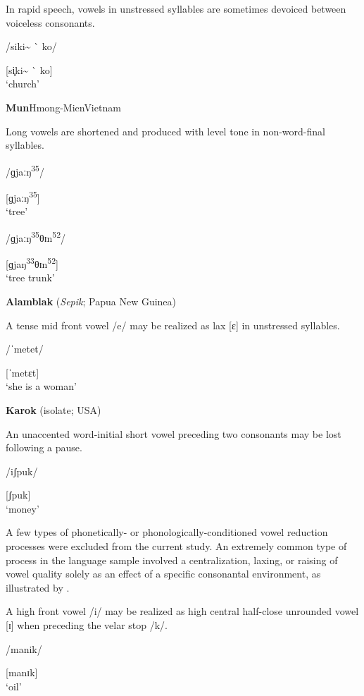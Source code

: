 In rapid speech, vowels in unstressed syllables are sometimes devoiced between voiceless consonants.

/siki\~{} \`{} ko/

[si̥ki\~{} \`{} ko]\\
\glt ‘church’
\citep[18]{Holt1999}
\z

\ea\label{ex:6.7}
 \textbf{Mun}{Hmong-Mien}{Vietnam}

Long vowels are shortened and produced with level tone in non-word-final syllables. 

\ea  /ɡjaːŋ\textsuperscript{35}/

[ɡjaːŋ\textsuperscript{35}]\\
\glt ‘tree’

\ex  /ɡjaːŋ\textsuperscript{35}θɪn\textsuperscript{52}/

[ɡjaŋ\textsuperscript{33}θɪn\textsuperscript{52}]\\
\glt ‘tree trunk’
\citep[117]{Clark2008}
\z
\z

\ea\label{ex:6.8}
  \textbf{Alamblak} (\textit{Sepik}; Papua New Guinea)

A tense mid front vowel /e/ may be realized as lax [ɛ] in unstressed syllables.

/ˈmetet/

[ˈmetɛt]\\
\glt ‘she is a woman’
\citep[38]{Bruce1984}
\z

\ea\label{ex:6.9}
   \textbf{Karok} (isolate; USA)

An unaccented word-initial short vowel preceding two consonants may be lost following a pause. 

/iʃpuk/

[ʃpuk]\\
\glt ‘money’
\citep[53]{Bright1957}
\z

  A few types of phonetically- or phonologically-conditioned vowel reduction processes were excluded from the current study. An extremely common type of process in the language sample involved a centralization, laxing, or raising of vowel quality solely as an effect of a specific consonantal environment, as illustrated by .

\ea\label{ex:6.10}

A high front vowel /i/ may be realized as high central half-close unrounded vowel [ɪ] when preceding the velar stop /k/.

/manik/

[manɪk]\\
\glt ‘oil’
\citep[15]{Dol2007}
\z

